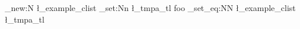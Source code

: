 \clist_new:N
  \l_example_clist
\tl_set:Nn
  \l_tmpa_tl
  { foo }
\clist_set_eq:NN  %
  \l_example_clist
  \l_tmpa_tl
